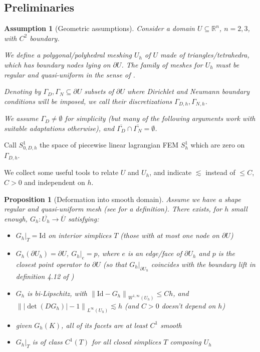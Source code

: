 \documentclass[english,a4paper,10pt,oneside]{scrbook}	%
\theoremstyle{break}
\newtheorem{prop}[equation]{Proposition}
\newtheorem{ass}[equation]{Assumption}
\theoremstyle{remark}
\newcommand{\mR}{\mathbb{R}}
\newcommand{\norm}[1]{\left\lVert#1\right\rVert}
\newcommand{\id}{\text{Id}}
\begin{document}
\begin{appendices}
\section{Preliminaries}

\begin{ass}[Geometric assumptions]
\label{ass:geo_ass_discr}
Consider a domain $U \subseteq \mR^n$, $n=2,3$, with $C^2$ boundary.

We define a polygonal/polyhedral meshing $U_h$ of $U$ made of triangles/tetrahedra, which has boundary nodes lying on $\partial U$. The family of meshes for $U_h$ must be regular and quasi-uniform in the sense of \cite{brenner_scott}.

Denoting by $\Gamma_D, \Gamma_N \subseteq \partial U$ subsets of $\partial U$ where Dirichlet and Neumann boundary conditions will be imposed, we call their discretizations $\Gamma_{D,h}, \Gamma_{N,h}$.

We assume $\Gamma_D \neq \emptyset $ for simplicity (but many of the following arguments work with suitable adaptations otherwise), and $\overline{\Gamma_D}\cap \overline{\Gamma_N} = \emptyset$.

\end{ass}

Call $S^1_{0,D,h} $ the space of piecewise linear lagrangian FEM $S^1_h$ which are zero on $\Gamma_{D,h}$.

We collect some useful tools to relate $U$ and $U_h$, and indicate $\lesssim$ instead of $\leq C$, $C>0$ and independent on $h$.

\begin{prop}[Deformation into smooth domain]
\label{prop:G_h}
Assume we have a shape regular and quasi-uniform mesh (see \cite{brenner_scott} for a definition). There exists, for $h$ small enough, $G_h: \overline{U_h} \rightarrow \overline{U}$ satisfying:

\begin{itemize}
	\item $G_h|_T = \id$ on interior simplices $T$ (those with at most one node on $\partial U$)
	\item $G_h(\partial U_h) = \partial U$, $G_h|_e=p$, where $e$ is an edge/face of $\partial U_h$ and $p$ is the closest point operator to $\partial U$ (so that $G_h|_{\partial U_h}$ coincides with the boundary lift in definition 4.12 of \cite{elliott})
	\item $G_h$ is bi-Lipschitz, with $\norm{\id -G_h}_{W^{1,\infty}(U_h)}\leq C h$, and $\norm{|\det(DG_h)|-1}_{L^\infty(U_h)}\lesssim h$ (and $C>0$ doesn't depend on $h$)
	\item given $G_h(K)$, all of its facets are at least $C^1$ smooth
	\item $G_h|_T$ is of class $C^1(T)$ for all closed simplices $T$ composing $U_h$
\end{itemize}


\end{prop}
\end{appendices}
\end{document}
